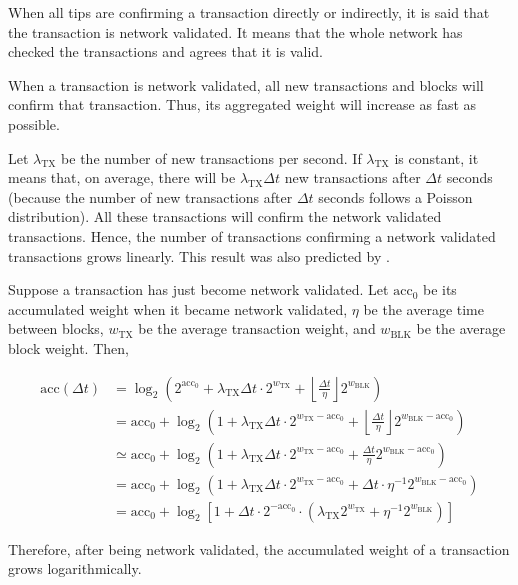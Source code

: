 When all tips are confirming a transaction directly or indirectly, it is said that the transaction is network validated. It means that the whole network has checked the transactions and agrees that it is valid.

When a transaction is network validated, all new transactions and blocks will confirm that transaction. Thus, its aggregated weight will increase as fast as possible.

Let $\lambda_\text{TX}$ be the number of new transactions per second. If $\lambda_\text{TX}$ is constant, it means that, on average, there will be $\lambda_\text{TX} \Delta t$ new transactions after $\Delta t$ seconds (because the number of new transactions after $\Delta t$ seconds follows a Poisson distribution). All these transactions will confirm the network validated transactions. Hence, the number of transactions confirming a network validated transactions grows linearly. This result was also predicted by \citet[p.14]{tangle2016}.

Suppose a transaction has just become network validated. Let $\text{acc}_0$ be its accumulated weight when it became network validated, $\eta$ be the average time between blocks, $w_\text{TX}$ be the average transaction weight, and $w_\text{BLK}$ be the average block weight. Then,

\begin{align*}
\text{acc}(\Delta t)
&= \log_2 \left(2^{\text{acc}_0} + \lambda_\text{TX} \Delta t \cdot 2^{w_\text{TX}} + \left\lfloor \frac{\Delta t}{\eta} \right\rfloor 2^{w_\text{BLK}} \right) \\
&= \text{acc}_0 + \log_2 \left(1 + \lambda_\text{TX} \Delta t \cdot 2^{w_\text{TX} - \text{acc}_0} + \left\lfloor \frac{\Delta t}{\eta} \right\rfloor 2^{w_\text{BLK} - \text{acc}_0} \right) \\
&\simeq \text{acc}_0 + \log_2 \left(1 + \lambda_\text{TX} \Delta t \cdot 2^{w_\text{TX} - \text{acc}_0} + \frac{\Delta t}{\eta} 2^{w_\text{BLK} - \text{acc}_0} \right) \\
&= \text{acc}_0 + \log_2 \left(1 + \lambda_\text{TX} \Delta t \cdot 2^{w_\text{TX} - \text{acc}_0} + \Delta t \cdot \eta^{-1} 2^{w_\text{BLK} - \text{acc}_0} \right) \\
&= \text{acc}_0 + \log_2 \left[1 + \Delta t \cdot 2^{-\text{acc}_0} \cdot ( \lambda_\text{TX} 2^{w_\text{TX}} + \eta^{-1} 2^{w_\text{BLK}} ) \right]
\end{align*}

Therefore, after being network validated, the accumulated weight of a transaction grows logarithmically.

